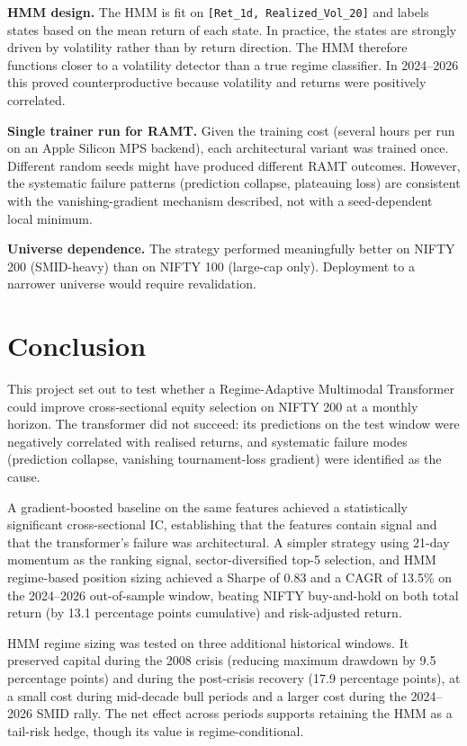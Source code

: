 \documentclass[conference]{IEEEtran}
\begin{document}
\textbf{HMM design.} The HMM is fit on \texttt{[Ret\_1d, Realized\_Vol\_20]} and labels states based on the mean return of each state. In practice, the states are strongly driven by volatility rather than by return direction. The HMM therefore functions closer to a volatility detector than a true regime classifier. In 2024--2026 this proved counterproductive because volatility and returns were positively correlated.

\textbf{Single trainer run for RAMT.} Given the training cost (several hours per run on an Apple Silicon MPS backend), each architectural variant was trained once. Different random seeds might have produced different RAMT outcomes. However, the systematic failure patterns (prediction collapse, plateauing loss) are consistent with the vanishing-gradient mechanism described, not with a seed-dependent local minimum.

\textbf{Universe dependence.} The strategy performed meaningfully better on NIFTY 200 (SMID-heavy) than on NIFTY 100 (large-cap only). Deployment to a narrower universe would require revalidation.

\section{Conclusion}

This project set out to test whether a Regime-Adaptive Multimodal Transformer could improve cross-sectional equity selection on NIFTY 200 at a monthly horizon. The transformer did not succeed: its predictions on the test window were negatively correlated with realised returns, and systematic failure modes (prediction collapse, vanishing tournament-loss gradient) were identified as the cause.

A gradient-boosted baseline on the same features achieved a statistically significant cross-sectional IC, establishing that the features contain signal and that the transformer's failure was architectural. A simpler strategy using 21-day momentum as the ranking signal, sector-diversified top-5 selection, and HMM regime-based position sizing achieved a Sharpe of 0.83 and a CAGR of 13.5\% on the 2024--2026 out-of-sample window, beating NIFTY buy-and-hold on both total return (by 13.1 percentage points cumulative) and risk-adjusted return.

HMM regime sizing was tested on three additional historical windows. It preserved capital during the 2008 crisis (reducing maximum drawdown by 9.5 percentage points) and during the post-crisis recovery (17.9 percentage points), at a small cost during mid-decade bull periods and a larger cost during the 2024--2026 SMID rally. The net effect across periods supports retaining the HMM as a tail-risk hedge, though its value is regime-conditional.
\end{document}
